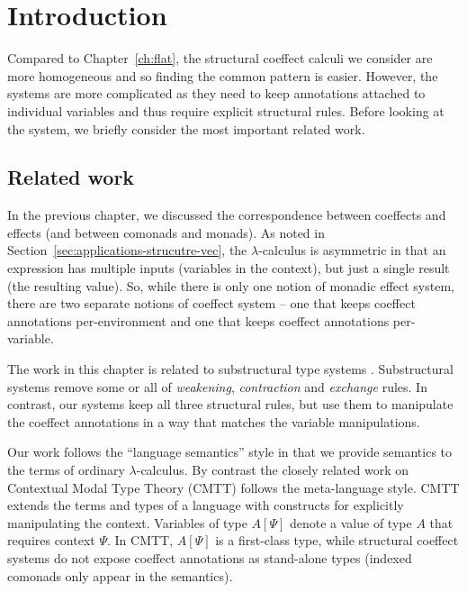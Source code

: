 \section{Introduction}
\label{sec:structural-intro}

Compared to Chapter~\ref{ch:flat}, the structural coeffect calculi we consider are more homogeneous
and so finding the common pattern is easier. However, the systems are more complicated as they need
to keep annotations attached to individual variables and thus require explicit structural rules.
Before looking at the system, we briefly consider the most important related work.


\subsection{Related work}

In the previous chapter, we discussed the correspondence between coeffects and effects (and
between comonads and monads). As noted in Section~\ref{sec:applications-strucutre-vec}, the
$\lambda$-calculus is asymmetric in that an expression has multiple inputs (variables in the
context), but just a single result (the resulting value). So, while there is only one notion of
monadic effect system, there are two separate notions of coeffect system -- one that keeps coeffect
annotations per-environment and one that keeps coeffect annotations per-variable.

The work in this chapter is related to substructural type systems \cite{substruct-attpl-intro}.
Substructural systems remove some or all of \emph{weakening}, \emph{contraction} and
\emph{exchange} rules. In contrast, our systems keep all three structural rules, but use them to
manipulate the coeffect annotations in a way that matches the variable manipulations.

Our work follows the ``language semantics'' style in that we provide semantics to the terms of
ordinary $\lambda$-calculus. By contrast the closely related work on Contextual Modal
Type Theory (CMTT) \cite{logic-cmtt} follows the meta-language style. CMTT extends the terms and
types of a language with constructs for explicitly manipulating the context. Variables
of type $A[\Psi]$ denote a value of type $A$ that requires context $\Psi$. In CMTT,
$A[\Psi]$ is a first-class type, while structural coeffect systems do not expose coeffect
annotations as stand-alone types (indexed comonads only appear in the semantics).

